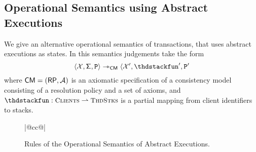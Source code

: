 \subsection{Operational Semantics using Abstract Executions}
We give an alternative operational semantics of transactions, that uses abstract executions as states. 
In this semantics judgements take the form 
\[
\langle \aexec, \thdstackFun, \prog \rangle \rightarrowtriangle_{\CM} \langle \aexec', \thdstackfun', \prog'
\]
where $\mathsf{CM} = (\mathsf{RP}, \mathcal{A})$ is an axiomatic specification of a consistency model
consisting of a resolution policy and a set of axioms, and $\thdstackfun: \tidset \rightharpoonup \ThdStacks$ 
is a partial mapping from client identifiers to stacks.

\begin{figure}
\begin{center}
\begin{tabular}{|@{}cc@{}|}
\end{tabular}
\end{center}
\caption{Rules of the Operational Semantics of Abstract Executions.}
\end{figure}

